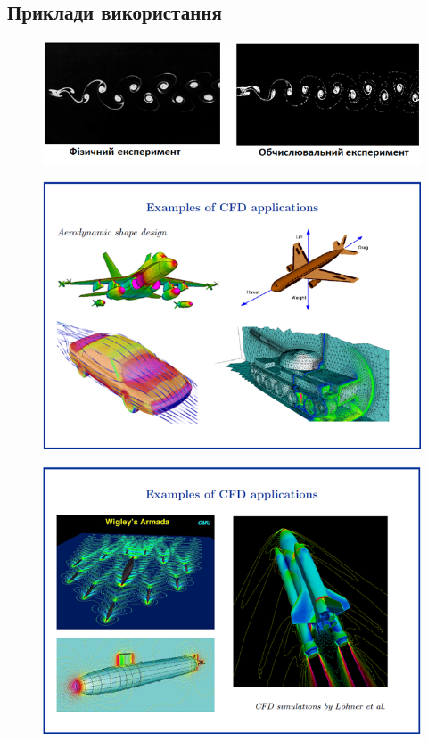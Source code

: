 \subsection{Приклади використання}
\begin{figure}[H]
    \centering
    \includegraphics[width=.8\textwidth]{img/01/5.png}
\end{figure}
\begin{figure}[H]
    \centering
    \includegraphics[width=.8\textwidth]{img/01/2.png}
\end{figure}
\begin{figure}[H]
    \centering
    \includegraphics[width=.9\textwidth]{img/01/3.png}
\end{figure} 
